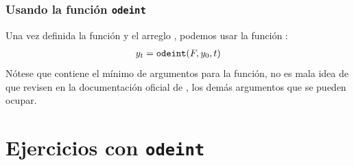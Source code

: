\begin{frame}
\frametitle{Usando la función \texttt{odeint}}
Una vez definida la función  y el arreglo  , podemos usar la función :
\begin{align*}
y_{t} = \text{\texttt{odeint}}(F, y_{0}, t)
\end{align*}
Nótese que contiene el mínimo de argumentos para la función, no es mala idea de que revisen en la documentación oficial de \python, los demás argumentos que se pueden ocupar.
\end{frame}
\section{Ejercicios con \texttt{odeint}}

